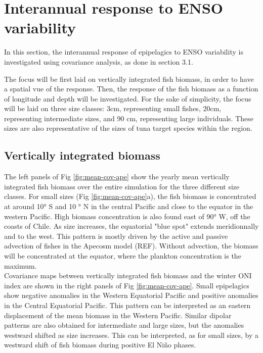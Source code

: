 \section{Interannual response to ENSO variability}

In this section, the interannual response of epipelagics to ENSO variability is investigated using covariance analysis, as done in section 3.1. 

The focus will be first laid on vertically integrated fish biomass, in order to have a spatial vue of the response. Then, the response of the fish biomass as a function of longitude and depth will be investigated.
For the sake of simplicity, the focus will be laid on three size classes: 3cm, representing small fishes, 20cm, representing intermediate sizes, and 90 cm, representing large individuals. These sizes are also representative of the sizes of tuna target species within the region.

\subsection{Vertically integrated biomass}

The left panels of Fig \ref{fig:mean-cov-ape} show the yearly mean vertically integrated fish biomass over the entire simulation for the three different size classes. For small sizes (Fig \ref{fig:mean-cov-ape}a), the fish biomass is concentrated at around 10° S and 10 ° N in the central Pacific and close to the equator in the western Pacific. High biomass concentration is also found east of 90° W, off the coasts of Chile. As size increases, the equatorial "blue spot" extends meridionnally and to the west. This pattern is mostly driven by the active and passive advection of fishes in the Apecosm model (REF). Without advection, the biomass will be concentrated at the equator, where the plankton concentration is the maximum. \\

Covariance maps between vertically integrated fish biomass and the winter ONI index are shown in the right panels of  Fig \ref{fig:mean-cov-ape}.
Small epipelagics show negative anomalies in the Western Equatorial Pacific and positive anomalies in the Central Equatorial Pacific. This pattern can be interpreted as an eastern displacement of the mean biomass in the Western Pacific.
Similar dipolar patterns are also obtained for intermediate and large sizes, but the anomalies westward shifted as size increases. This can be interpreted, as for small sizes, by a westward shift of fish biomass during positive El Niño phases.

